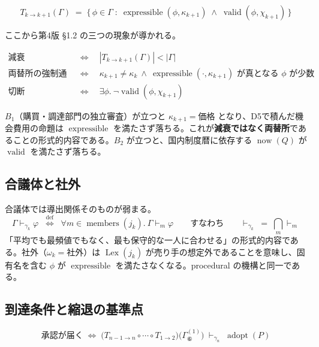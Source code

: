 \documentclass[11pt,a4paper]{article}
\newcommand{\now}{\operatorname{now}}
\newcommand{\Lex}{\operatorname{Lex}}
\newcommand{\adopt}{\operatorname{adopt}}
\newcommand{\expr}{\operatorname{expressible}}
\newcommand{\val}{\operatorname{valid}}
\newcommand{\members}{\operatorname{members}}
\begin{document}
\begin{equation}\label{eq:T}
T_{k \to k+1}(\Gamma) \;=\; \{\, \phi \in \Gamma \;:\; \expr(\phi, \kappa_{k+1}) \;\wedge\; \val(\phi, \chi_{k+1}) \,\}
\end{equation}

ここから第4版 \S1.2 の三つの現象が導かれる。

\begin{align}
\text{減衰} \quad&\Longleftrightarrow\quad |T_{k\to k+1}(\Gamma)| < |\Gamma| \\
\text{両替所の強制通過} \quad&\Longleftrightarrow\quad \kappa_{k+1} \neq \kappa_k \ \wedge\ \expr(\cdot,\kappa_{k+1}) \text{ が真となる } \phi \text{ が少数} \\
\text{切断} \quad&\Longleftrightarrow\quad \exists \phi.\ \neg\val(\phi, \chi_{k+1})
\end{align}

$B_1$（購買・調達部門の独立審査）が立つと $\kappa_{k+1} = \text{価格}$ となり、D5で積んだ機会費用の命題は $\expr$ を満たさず落ちる。これが\textbf{減衰ではなく両替所}であることの形式的内容である。$B_2$ が立つと、国内制度暦に依存する $\now(Q)$ が $\val$ を満たさず落ちる。

\subsection{合議体と社外}

合議体では導出関係そのものが弱まる。
\begin{equation}
\Gamma \vdash_{\gamma_k} \varphi \;\;\overset{\text{def}}{\Longleftrightarrow}\;\; \forall m \in \members(j_k).\ \Gamma \vdash_m \varphi
\qquad\text{すなわち}\qquad
\vdash_{\gamma_k} \;=\; \bigcap_{m} \vdash_m
\end{equation}
「平均でも最頻値でもなく、最も保守的な一人に合わせる」の形式的内容である。社外（$\omega_k = \text{社外}$）は $\Lex(j_k)$ が売り手の想定外であることを意味し、固有名を含む $\phi$ が $\expr$ を満たさなくなる。procedural の機構と同一である。

\subsection{到達条件と縮退の基準点}

\begin{equation}\label{eq:reach}
\boxed{\;\text{承認が届く} \;\Longleftrightarrow\;
\bigl(T_{n-1 \to n} \circ \cdots \circ T_{1 \to 2}\bigr)\bigl(\Gamma_{⑥}^{(1)}\bigr) \;\vdash_{\gamma_n}\; \adopt(P) \;}
\end{equation}
\end{document}
